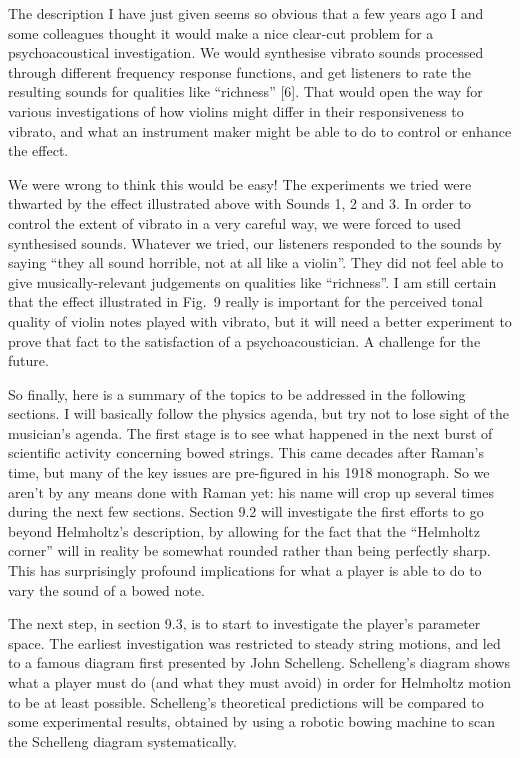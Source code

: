   The description I have just given seems so obvious that a few years ago I and 
  some colleagues thought it would make a nice clear-cut problem for a 
  psychoacoustical investigation. We would synthesise vibrato sounds processed 
  through different frequency response functions, and get listeners to rate the 
  resulting sounds for qualities like “richness” [6]. That would open the way 
  for various investigations of how violins might differ in their 
  responsiveness to vibrato, and what an instrument maker might be able to do 
  to control or enhance the effect. 

  We were wrong to think this would be easy! The experiments we tried were 
  thwarted by the effect illustrated above with Sounds 1, 2 and 3. In order to 
  control the extent of vibrato in a very careful way, we were forced to used 
  synthesised sounds. Whatever we tried, our listeners responded to the sounds 
  by saying “they all sound horrible, not at all like a violin”. They did not 
  feel able to give musically-relevant judgements on qualities like “richness”. 
  I am still certain that the effect illustrated in Fig.\ 9 really is important 
  for the perceived tonal quality of violin notes played with vibrato, but it 
  will need a better experiment to prove that fact to the satisfaction of a 
  psychoacoustician. A challenge for the future. 

  So finally, here is a summary of the topics to be addressed in the following 
  sections. I will basically follow the physics agenda, but try not to lose 
  sight of the musician’s agenda. The first stage is to see what happened in 
  the next burst of scientific activity concerning bowed strings. This came 
  decades after Raman’s time, but many of the key issues are pre-figured in his 
  1918 monograph. So we aren’t by any means done with Raman yet: his name will 
  crop up several times during the next few sections. Section 9.2 will 
  investigate the first efforts to go beyond Helmholtz’s description, by 
  allowing for the fact that the “Helmholtz corner” will in reality be somewhat 
  rounded rather than being perfectly sharp. This has surprisingly profound 
  implications for what a player is able to do to vary the sound of a bowed 
  note. 

  The next step, in section 9.3, is to start to investigate the player’s 
  parameter space. The earliest investigation was restricted to steady string 
  motions, and led to a famous diagram first presented by John Schelleng. 
  Schelleng’s diagram shows what a player must do (and what they must avoid) in 
  order for Helmholtz motion to be at least possible. Schelleng’s theoretical 
  predictions will be compared to some experimental results, obtained by using 
  a robotic bowing machine to scan the Schelleng diagram systematically. 

